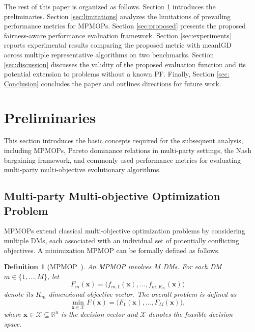 \documentclass[journal]{IEEEtran}
\newtheorem{definition}{Definition}
\begin{document}
The rest of this paper is organized as follows. Section \ref{sec:preliminaries} introduces the preliminaries. 
Section \ref{sec:limitations} analyzes the limitations of prevailing performance metrics for MPMOPs. Section \ref{sec:proposed} presents the proposed fairness-aware performance evaluation framework. Section \ref{sec:experiments} reports experimental results comparing the proposed metric with meanIGD across multiple representative algorithms on two benchmarks. Section \ref{sec:discussion} discusses the validity of the proposed evaluation function and its potential extension to problems without a known PF. Finally,  Section \ref{sec: Conclusion} concludes the paper and outlines directions for future work.

\section{Preliminaries}
\label{sec:preliminaries}

This section introduces the basic concepts required for the subsequent analysis, including MPMOPs, Pareto dominance relations in multi-party settings, the Nash bargaining framework, and commonly used performance metrics for evaluating multi-party multi-objective evolutionary algorithms.

\subsection{Multi-party Multi-objective Optimization Problem}

MPMOPs extend classical multi-objective optimization problems by considering multiple DMs, each associated with an individual set of potentially conflicting objectives. A minimization MPMOP can be formally defined as follows.

\begin{definition}[MPMOP~\cite{liu2020evolutionary}]
	\label{def:MPMOP}
	An MPMOP involves $M$ DMs. For each DM $m \in \{1,\dots,M\}$, let
	\[
	F_m(\mathbf{x}) = \big(f_{m,1}(\mathbf{x}),\dots,f_{m,K_m}(\mathbf{x})\big)
	\]
	denote its $K_m$-dimensional objective vector. The overall problem is defined as
	\[
	\min_{\mathbf{x} \in \mathcal{X}}
	F(\mathbf{x}) = \big(F_1(\mathbf{x}),\dots,F_M(\mathbf{x})\big),
	\]
	where $\mathbf{x} \in \mathcal{X} \subseteq \mathbb{R}^n$ is the decision vector and $\mathcal{X}$ denotes the feasible decision space.
\end{definition}
\end{document}
